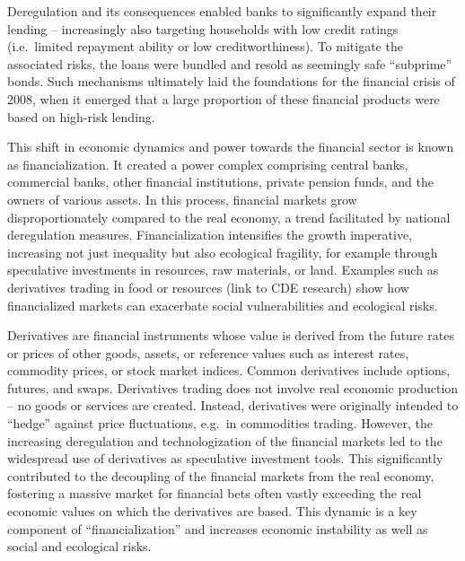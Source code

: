 \documentclass[
  a4paper,
  openany]{book}
\begin{document}
Deregulation and its consequences enabled banks to significantly expand
their lending -- increasingly also targeting households with low credit
ratings (i.e.~limited repayment ability or low creditworthiness). To
mitigate the associated risks, the loans were bundled and resold as
seemingly safe ``subprime'' bonds. Such mechanisms ultimately laid the
foundations for the financial crisis of 2008, when it emerged that a
large proportion of these financial products were based on high-risk
lending.

This shift in economic dynamics and power towards the financial sector
is known as financialization. It created a power complex comprising
central banks, commercial banks, other financial institutions, private
pension funds, and the owners of various assets. In this process,
financial markets grow disproportionately compared to the real economy,
a trend facilitated by national deregulation measures. Financialization
intensifies the growth imperative, increasing not just inequality but
also ecological fragility, for example through speculative investments
in resources, raw materials, or land. Examples such as derivatives
trading in food or resources (link to CDE research) show how
financialized markets can exacerbate social vulnerabilities and
ecological risks.

\begin{tcolorbox}[enhanced jigsaw, coltitle=black, bottomtitle=1mm, opacitybacktitle=0.6, titlerule=0mm, opacityback=0, leftrule=.75mm, colbacktitle=quarto-callout-note-color!10!white, bottomrule=.15mm, toptitle=1mm, breakable, title={What are derivatives and how do they contribute to financialization?}, arc=.35mm, rightrule=.15mm, toprule=.15mm, left=2mm, colback=white, colframe=quarto-callout-note-color-frame]

Derivatives are financial instruments whose value is derived from the
future rates or prices of other goods, assets, or reference values such
as interest rates, commodity prices, or stock market indices. Common
derivatives include options, futures, and swaps. Derivatives trading
does not involve real economic production -- no goods or services are
created. Instead, derivatives were originally intended to ``hedge''
against price fluctuations, e.g.~in commodities trading. However, the
increasing deregulation and technologization of the financial markets
led to the widespread use of derivatives as speculative investment
tools. This significantly contributed to the decoupling of the financial
markets from the real economy, fostering a massive market for financial
bets often vastly exceeding the real economic values on which the
derivatives are based. This dynamic is a key component of
``financialization'' and increases economic instability as well as
social and ecological risks.

\end{tcolorbox}
\end{document}
